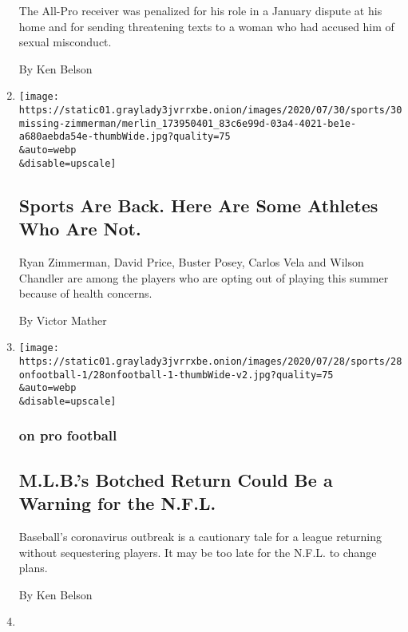 \begin{enumerate}
  The All-Pro receiver was penalized for his role in a January dispute
  at his home and for sending threatening texts to a woman who had
  accused him of sexual misconduct.

  By Ken Belson
\item
  \href{/2020/07/30/sports/players-opt-out.html}{}

  \texttt{[image: https://static01.graylady3jvrrxbe.onion/images/2020/07/30/sports/30missing-zimmerman/merlin\_173950401\_83c6e99d-03a4-4021-be1e-a680aebda54e-thumbWide.jpg?quality=75\\\&auto=webp\\\&disable=upscale]}

  \hypertarget{sports-are-back-here-are-some-athletes-who-are-not}{%
  \subsection{Sports Are Back. Here Are Some Athletes Who Are
  Not.}\label{sports-are-back-here-are-some-athletes-who-are-not}}

  Ryan Zimmerman, David Price, Buster Posey, Carlos Vela and Wilson
  Chandler are among the players who are opting out of playing this
  summer because of health concerns.

  By Victor Mather
\item
  \href{/2020/07/29/sports/football/nfl-mlb-opting-out.html}{}

  \texttt{[image: https://static01.graylady3jvrrxbe.onion/images/2020/07/28/sports/28onfootball-1/28onfootball-1-thumbWide-v2.jpg?quality=75\\\&auto=webp\\\&disable=upscale]}

  \hypertarget{on-pro-football}{%
  \subsubsection{on pro football}\label{on-pro-football}}

  \hypertarget{mlbs-botched-return-could-be-a-warning-for-the-nfl}{%
  \subsection{M.L.B.'s Botched Return Could Be a Warning for the
  N.F.L.}\label{mlbs-botched-return-could-be-a-warning-for-the-nfl}}

  Baseball's coronavirus outbreak is a cautionary tale for a league
  returning without sequestering players. It may be too late for the
  N.F.L. to change plans.

  By Ken Belson
\item
  \href{/2020/07/25/sports/football/woody-johnson-trump-jets.html}{}


\end{enumerate}
